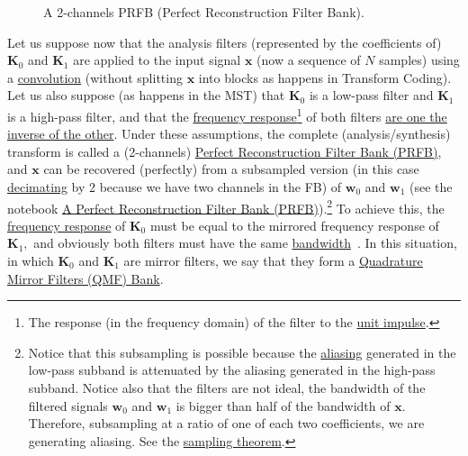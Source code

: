 \begin{figure}
  \centering
  \caption{A 2-channels PRFB (Perfect Reconstruction Filter Bank).}
  \label{fig:PRFB}
\end{figure}

Let us suppose now that the analysis filters (represented by the
coefficients of) ${\mathbf K}_0$ and ${\mathbf K}_1$ are applied to
the input signal ${\mathbf x}$ (now a sequence of $N$ samples) using a
\href{https://en.wikipedia.org/wiki/Kernel_(image_processing)}{convolution}
(without splitting $\mathbf{x}$ into blocks as happens in Transform
Coding). Let us also suppose (as happens in the MST) that
${\mathbf K}_0$ is a low-pass filter and ${\mathbf K}_1$ is a
high-pass filter, and that the
\href{https://en.wikipedia.org/wiki/Filter_(signal_processing)}{frequency
  response}\footnote{The response (in the frequency domain) of the
  filter to the
  \href{https://en.wikipedia.org/?title=Unit_impulse&redirect=no}{unit
    impulse}.} of both filters
\href{https://en.wikipedia.org/wiki/Filter_bank#Perfect_reconstruction_filter_banks}{are
  one the inverse of the other}. Under these assumptions, the complete
(analysis/synthesis) transform is called a (2-channels)
\href{https://en.wikipedia.org/wiki/Filter_bank#Perfect_reconstruction_filter_banks}{Perfect
  Reconstruction Filter Bank (PRFB)}, and ${\mathbf x}$ can be
recovered (perfectly) from a subsampled version (in this case
\href{https://en.wikipedia.org/wiki/Downsampling_(signal_processing)}{decimating}
by 2 because we have two channels in the FB) of ${\mathbf w}_0$ and
${\mathbf w}_1$ (see the notebook
\href{https://github.com/Tecnologias-multimedia/intercom/blob/master/docs/PRFB.ipynb}{A
  Perfect Reconstruction Filter Bank (PRFB)}).\footnote{Notice that
  this subsampling is possible because the
  \href{https://en.wikipedia.org/wiki/Aliasing}{aliasing} generated in
  the low-pass subband is attenuated by the aliasing generated in the
  high-pass subband. Notice also that the filters are not ideal, the
  bandwidth of the filtered signals ${\mathbf w}_0$ and
  ${\mathbf w}_1$ is bigger than half of the bandwidth of
  ${\mathbf x}$. Therefore, subsampling at a ratio of one of each two
  coefficients, we are generating aliasing. See the
  \href{https://en.wikipedia.org/wiki/Nyquist-Shannon_sampling_theorem}{sampling
    theorem}.} To achieve this, the
\href{https://en.wikipedia.org/wiki/Filter_(signal_processing)}{frequency
  response} of ${\mathbf K}_0$ must be equal to the mirrored frequency
response of ${\mathbf K}_1,$ and obviously both filters must have the
same
\href{https://en.wikipedia.org/wiki/Bandwidth_(signal_processing)}{bandwidth}~\cite{sayood2017introduction}. In
this situation, in which ${\mathbf K}_0$ and ${\mathbf K}_1$ are
mirror filters, we say that they form a
\href{https://en.wikipedia.org/wiki/Quadrature_mirror_filter}{Quadrature
  Mirror Filters (QMF) Bank}.

